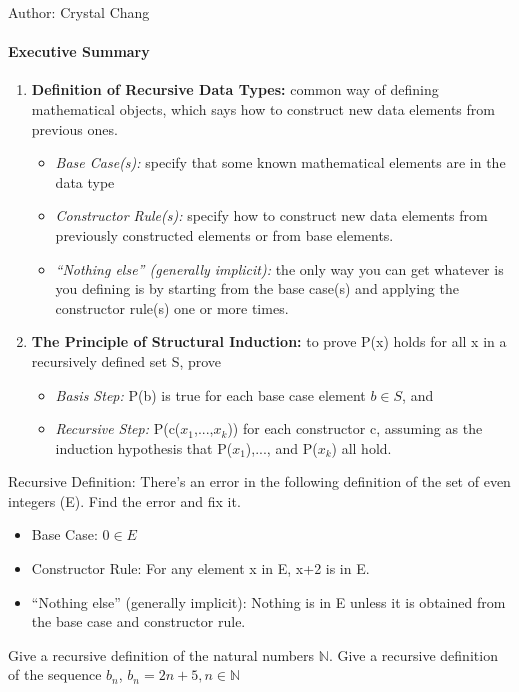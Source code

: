 \documentclass[solution, letterpaper]{cs20inclass}
\begin{document}

\noindent Author: Crystal Chang

\paragraph*{Executive Summary}
\begin{enumerate}
\item \textbf{Definition of Recursive Data Types:} common way of defining mathematical objects, which says how to construct new data elements from previous ones.
\begin{itemize}
\item {\em Base Case(s):} specify that some known mathematical elements are in the data type
\item {\em Constructor Rule(s):} specify how to construct new data elements from previously constructed elements or from base elements.
\item {\em “Nothing else” (generally implicit):} the only way you can get whatever is you defining is by starting from the base case(s) and applying the constructor rule(s) one or more times.
\end{itemize}

\item \textbf{The Principle of Structural Induction:} to prove P(x) holds for all x in a recursively defined set S, prove
\begin{itemize}
\item {\em Basis Step:} P(b) is true for each base case element $b \in S$, and 
\item {\em Recursive Step:} P(c($x_1$,...,$x_k$)) for each constructor c, assuming as the induction hypothesis that P($x_1$),..., and P($x_k$) all hold.
\end{itemize}
\end{enumerate}

\problem Recursive Definition:
\subproblem There's an error in the following definition of the set of even integers (E). Find the error and fix it. 
\begin{itemize}
\item Base Case:  $0\in E$
\item Constructor Rule: For any element x in E, x+2 is in E. 
\item “Nothing else” (generally implicit): Nothing is in E unless it is obtained from the base case and constructor rule.
\end{itemize}
\subproblem Give a recursive definition of the natural numbers $\mathbb{N}$.
\subproblem Give a recursive definition of the sequence $b_n$, $b_n=2n+5,  n\in\mathbb{N}$
\pagebreak
\end{document}
